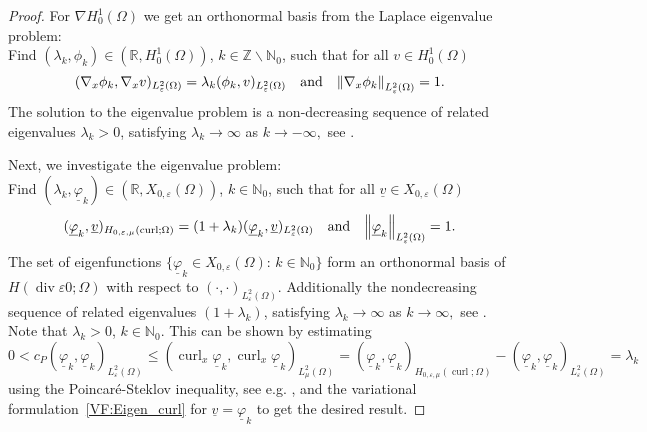 \documentclass[a4paper,11pt]{article}
\newcommand{\N}{\mathbb N}
\newcommand{\Z}{\mathbb Z}
\newcommand{\R}{\mathbb R}
\newcommand{\cu}{\operatorname{curl}}
\newcommand{\di}{\operatorname{div}}
\renewcommand{\vec}[1]{\underline{#1}}
\newcommand{\norm}[1]{{\left\lVert{#1}\right\rVert}}
\begin{document}
\begin{proof}
	For $\nabla H^1_0(\Omega) $ we get an orthonormal basis from the Laplace eigenvalue problem: \\
	Find  $(\lambda_k,\phi_k) \in (\R, H^1_0(\Omega))$, $ k \in \Z\backslash\N_0$, such that for all $ v\in H^1_0(\Omega)$
	\begin{equation*}
		(\nabla_x \phi_k, \nabla_x v)_{L^2_\varepsilon(\Omega)} = \lambda_k (\phi_k, v)_{L^2_{\varepsilon}(\Omega)}\quad \textmd{and} \quad \norm{\nabla_x\phi_k}_{L^2_\varepsilon(\Omega)}= 1.
	\end{equation*}
	The solution to the eigenvalue problem is a non-decreasing sequence of related eigenvalues $\lambda_k > 0$, satisfying $\lambda_k \to \infty$ as $k \to -\infty,$ see \cite[Section~4 in Chapter~4]{Ladyzhenskaya1985}. 
	
	Next, we investigate the eigenvalue problem:\\
	Find  $(\lambda_k,\vec \varphi_k) \in (\R,X_{0,\varepsilon}(\Omega))$, $ k \in \N_0$, such that 	for all $ \vec v \in X_{0,\varepsilon}(\Omega)$
	\begin{equation} \label{VF:Eigen_curl}
		(\vec  \varphi_k, \vec v)_{H_{0,\varepsilon,\mu}(\cu;\Omega)} = (1+\lambda_k) (\vec \varphi_k, \vec v)_{L^2_\varepsilon(\Omega)} \quad \textmd{and} \quad\norm{\vec \varphi_k}_{L^2_\varepsilon(\Omega)}= 1.
	\end{equation}
	The set of eigenfunctions $\{ \vec \varphi_k \in X_{0,\varepsilon}(\Omega) : \, k \in \N_0 \}$ form an orthonormal basis of $ H(\di \varepsilon 0;\Omega)$ with respect to $(\cdot, \cdot)_{L^2_\varepsilon(\Omega)}$. Additionally the nondecreasing sequence of related eigenvalues $ (1+\lambda_k)$, satisfying $\lambda_k \to \infty$ as $k \to \infty,$ see \cite[Theorem~8.2.4]{Assous2018}. Note that $\lambda_k>0$, $k\in \N_0$. This can be shown by estimating
	\begin{equation*}
		0 < c_P(\vec \varphi_k, \vec \varphi_k)_{L^2_\varepsilon(\Omega)} \leq (\cu_x\vec \varphi_k,\cu_x \vec \varphi_k)_{L^2_\mu(\Omega)} =  (\vec \varphi_k, \vec \varphi_k)_{H_{0,\varepsilon,\mu}(\cu;\Omega)} - (\vec \varphi_k, \vec \varphi_k)_{L^2_\varepsilon(\Omega)}= \lambda_k
	\end{equation*}
	using the Poincar\'{e}-Steklov inequality, see e.g. \cite[Lem.~44.4]{ErnGuermond2020II}, and  the  variational formulation~\eqref{VF:Eigen_curl} for $\vec v = \vec \varphi_k$ to get the desired result.
	

\end{proof}
\end{document}
